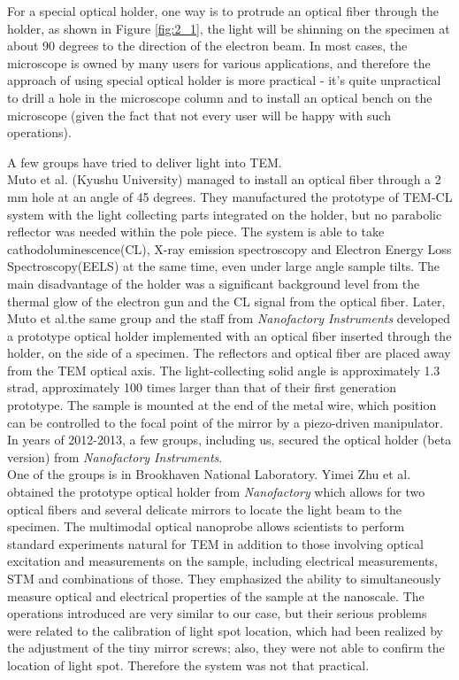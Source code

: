 For a special optical holder, one way is to protrude an optical fiber through the holder, as shown in Figure \ref{fig:2_1}, the light will be shinning on the specimen at about 90 degrees to the direction of the electron beam. In most cases, the microscope is owned by many users for various applications, and therefore the approach of using special optical holder is more practical - it's quite unpractical to drill a hole in the microscope column and to install an optical bench on the microscope (given the fact that not every user will be happy with such operations). 

A few groups have tried to deliver light into TEM. \\

Muto et al. (Kyushu University) managed to install an optical fiber through a 2 mm hole at an angle of 45 degrees.\cite{Tanabe2002,Furumoto2013} They manufactured the prototype of TEM-CL system with the light collecting parts integrated on the holder, but no parabolic reflector was needed within the pole piece. The system is able to take cathodoluminescence(CL), X-ray emission spectroscopy and Electron Energy Loss Spectroscopy(EELS) at the same time, even under large angle sample tilts. The main disadvantage of the holder was a significant background level from the thermal glow of the electron gun and the CL signal from the optical fiber. Later, Muto et al.the same group and the staff from {\it Nanofactory Instruments} developed a prototype optical holder implemented with an optical fiber inserted through the holder, on the side of a specimen. The reflectors and optical fiber are placed away from the TEM optical axis. The light-collecting solid angle is approximately 1.3 strad, approximately 100 times larger than that of their first generation prototype. The sample is mounted at the end of the metal wire, which  position can be controlled to the focal point of the mirror by a piezo-driven manipulator. In years of 2012-2013, a few groups, including us, secured the optical holder (beta version) from {\it Nanofactory Instruments}. \\

One of the groups is in Brookhaven National Laboratory. Yimei Zhu et al. obtained the prototype optical holder from {\em Nanofactory} which allows for two optical fibers and several delicate mirrors to locate the light beam to the specimen. 
The multimodal optical nanoprobe allows scientists to perform standard experiments natural for TEM in addition to those involving optical excitation and measurements on the sample, including electrical measurements, STM and combinations of those. They emphasized the ability to simultaneously measure optical and electrical properties of the sample at the nanoscale.\cite{Zhu2012Multimodal}  The operations introduced are very similar to our case, but their serious problems were related to the calibration of light spot location, which had been realized by the adjustment of the tiny mirror screws; also, they were not able to confirm the location of light spot. Therefore the system was not that practical. \\

